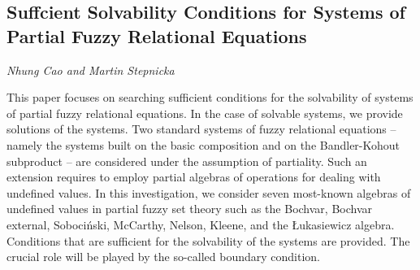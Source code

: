 \documentclass[../booklet.tex]{subfiles}
\begin{document}
\subsection[Suffcient Solvability Conditions for Systems of Partial Fuzzy Relational Equations. {\it Nhung Cao and Martin Stepnicka}]{Suffcient Solvability Conditions for Systems of Partial Fuzzy Relational Equations}
 

\begin{center}
  {\it Nhung Cao and Martin Stepnicka}
\end{center}



This paper focuses on searching sufficient conditions for the solvability of systems of partial fuzzy relational equations. In the case of solvable systems, we provide solutions of the systems. Two standard systems of fuzzy relational equations -- namely the systems built on the basic composition and on the Bandler-Kohout subproduct -- are considered under the assumption of partiality. Such an extension requires to employ partial algebras of operations for dealing with undefined values. In this investigation, we consider seven most-known algebras of undefined values in partial fuzzy set theory such as the Bochvar, Bochvar external, Soboci\'{n}ski, McCarthy, Nelson, Kleene, and the \L{}ukasiewicz algebra. Conditions that are sufficient for the solvability of the systems are provided. The crucial role will be played by the so-called  boundary condition.  

\end{document}
